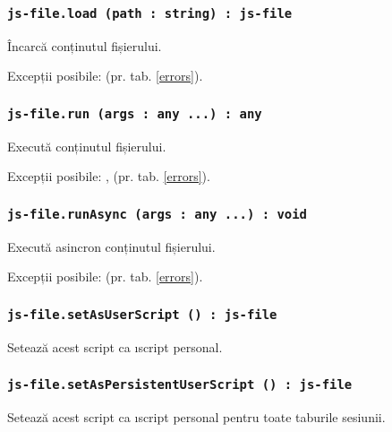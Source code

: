 \subsubsection{\texttt{js-file.load (path : string) : js-file}}

Încarcă conținutul fișierului.

Excepții posibile:  (pr. tab. \ref{errors}).

\subsubsection{\texttt{js-file.run (args : any ...) : any}}

Execută conținutul fișierului.

Excepții posibile: ,  (pr. tab. \ref{errors}).

\subsubsection{\texttt{js-file.runAsync (args : any ...) : void}}

Execută asincron conținutul fișierului.

Excepții posibile:  (pr. tab. \ref{errors}).

\subsubsection{\texttt{js-file.setAsUserScript () : js-file}}

Setează acest script ca \i{script personal}.

\subsubsection{\texttt{js-file.setAsPersistentUserScript () : js-file}}

Setează acest script ca \i{script personal} pentru toate taburile sesiunii.

